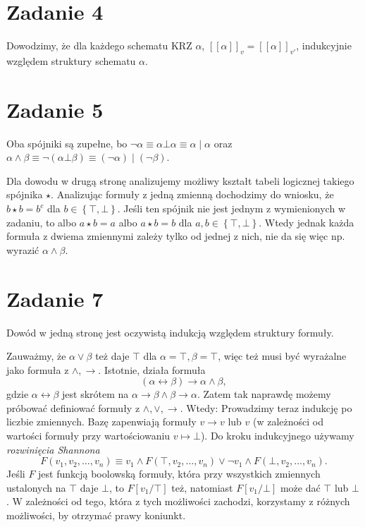 \section*{Zadanie 4}

Dowodzimy, że dla każdego schematu KRZ \( \alpha \), \( [[\alpha ]]_v = [[\alpha ]]_{v'} \), indukcyjnie względem struktury schematu \( \alpha \).

\section*{Zadanie 5} 

Oba spójniki są zupełne, bo \( \neg \alpha \equiv \alpha \bot \alpha \equiv \alpha \mid \alpha \) oraz \( \alpha \wedge \beta \equiv \neg (\alpha \bot \beta) \equiv (\neg \alpha) \mid (\neg \beta) \).

Dla dowodu w drugą stronę analizujemy możliwy kształt tabeli logicznej takiego spójnika \( \star \). Analizując formuły z jedną zmienną dochodzimy do wniosku, że \( b \star b = b^c \) dla \( b \in \left\{ \top, \bot \right\} \). Jeśli ten spójnik nie jest jednym z wymienionych w zadaniu, to albo \( a \star b = a \) albo \( a \star b = b \) dla \( a, b \in \left\{ \top, \bot \right\} \). Wtedy jednak każda formuła z dwiema zmiennymi zależy tylko od jednej z nich, nie da się więc np. wyrazić \( \alpha \wedge \beta \).

\section*{Zadanie 7}

Dowód w jedną stronę jest oczywistą indukcją względem struktury formuły.

Zauważmy, że \( \alpha \vee \beta \) też daje \( \top \) dla \( \alpha = \top, \beta = \top \), więc też musi być wyrażalne jako formuła z \( \wedge, \to \). Istotnie, działa formuła
\[ 
    (\alpha \leftrightarrow \beta) \to \alpha \wedge \beta,
\]
gdzie \(\alpha \leftrightarrow \beta\) jest skrótem na \( \alpha \to \beta \wedge \beta \to \alpha \). Zatem tak naprawdę możemy próbować definiować formuły z \( \wedge, \vee, \to \). Wtedy:
Prowadzimy teraz indukcję po liczbie zmiennych. Bazę zapenwiają formuły \( v \to v \) lub \( v \) (w zależności od wartości formuły przy wartościowaniu \( v \mapsto \bot \)). Do kroku indukcyjnego używamy \textit{rozwinięcia Shannona}
\[ 
    F(v_1, v_2, \ldots, v_n) \equiv v_1 \wedge F(\top, v_2, \ldots, v_n) \vee \neg v_1 \wedge F(\bot, v_2, \ldots, v_n).
\]
Jeśli \( F \) jest funkcją boolowską formuły, która przy wszystkich zmiennych ustalonych na \( \top \) daje \( \bot \), to \( F[v_1/\top] \) też, natomiast \( F[v_1/\bot] \) może dać \( \top \) lub \( \bot \). W zależności od tego, która z tych możliwości zachodzi, korzystamy z różnych możliwości, by otrzymać prawy koniunkt.

